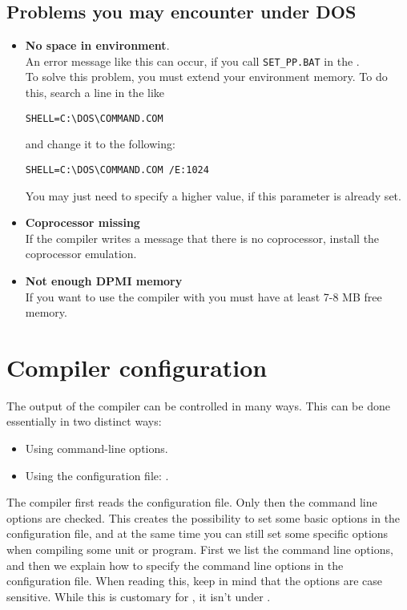 \documentclass{report}
\begin{document}
\section{Problems you may encounter under DOS}
\begin{itemize}
\item \textbf{No space in environment}.\\
An error message like this can occur, if you call 
\verb|SET_PP.BAT| in the .\\
To solve this problem, you must extend your environment memory.
To do this, search a line in the  like
\begin{verbatim}
SHELL=C:\DOS\COMMAND.COM
\end{verbatim}
and change it to the following: 
\begin{verbatim}
SHELL=C:\DOS\COMMAND.COM /E:1024
\end{verbatim}
You may just need to specify a higher value, if this parameter is already set.
\item \textbf{ Coprocessor missing}\\ 
If the compiler writes
a message that there is no coprocessor, install
the coprocessor emulation.
\item \textbf{Not enough DPMI memory}\\ 
If you want to use the compiler with  you must have at least
7-8 MB free  memory.
\end{itemize}



\chapter{Compiler configuration}
The output of the compiler can be controlled in many ways. This can be done
essentially in two distinct ways:
\begin{itemize}
\item Using command-line options.
\item Using the configuration file: .
\end{itemize}
The compiler first reads the configuration file. Only then the command line
options are checked. This creates the possibility to set some basic options
in the configuration file, and at the same time you can still set some
specific options when compiling some unit or program. First we list the
command line options, and then we explain how to specify the command
line options in the configuration file. When reading this, keep in mind
that the options are case sensitive. While this is customary for \linux, it
isn't under \dos.
  
\end{document}
